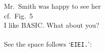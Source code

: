 \documentclass{article}
\begin{document}
Mr.~Smith was happy to see her\\
cf.~Fig.~5\\
I like BASIC\@. What about you?\\
\\
See the space follows `\texttt{EIEI.}':\\
\\
\\
\end{document}
